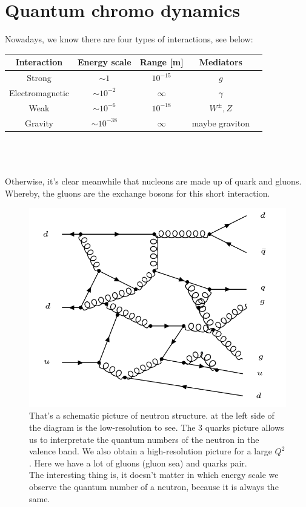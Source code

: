 \section{Quantum chromo dynamics}

Nowadays, we know there are four types of interactions, see below:\\


\begin{tabular}{|c|c|c|c|c|}
\hline 
Interaction & Energy scale & Range [m] & Mediators \\ 
\hline 
Strong & $ \sim 1 $  & $10^{-15} $ & $g$ \\ 
\hline 
Electromagnetic & $ \sim 10^{-2} $ & $\infty$ & $\gamma $ \\ 
\hline  
Weak & $ \sim 10^{-6} $ & $10^{-18}$ & $W^{\pm}, Z$ \\ 
\hline
Gravity & $ \sim 10^{-38} $ & $\infty$ & maybe graviton \\ 
\hline 
\end{tabular}  
\\
\\
\\
Otherwise, it's clear meanwhile that nucleons are made up of quark and gluons.
Whereby, the gluons are the exchange bosons for this short interaction.
\begin{figure}[h!]
\centering
\includegraphics[scale=0.7]{images/Intro/Neutron.png}
\caption{That's a schematic picture of neutron structure. at the left side of the diagram is the low-resolution to see. The 3 quarks picture allows us to interpretate the quantum numbers of the neutron in the valence band.
We also obtain a high-resolution picture for a large $ Q^2 $. Here we have a lot of gluons (gluon sea) and quarks pair. \cite{Cunha13} \\ 
The interesting thing is, it doesn't matter in which energy scale we observe the quantum number of a neutron, because it is always the same.}
\end{figure}
